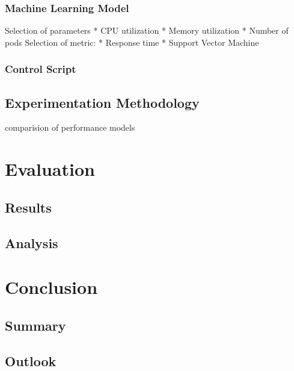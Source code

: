 \documentclass[
	english,
	ruledheaders=section,%
	class=report,%
	thesis={type=master},%
	accentcolor=8c,%
	custommargins=true,%
	marginpar=false,%
	parskip=half-,%
	fontsize=11pt,%
]{tudapub}
\begin{document}
\subsection{Machine Learning Model}
Selection of parameters
* CPU utilization
* Memory utilization
* Number of pods
Selection of metric:
* Response time
* Support Vector Machine
\subsection{Control Script}
\section{Experimentation Methodology}
comparision of performance models
\newpage
\chapter{Evaluation}
\section{Results}
\section{Analysis}
\newpage
\chapter{Conclusion}
\section{Summary}
\section{Outlook}
\newpage
\renewcommand{\bibname}{References}
\printbibliography
\end{document}
